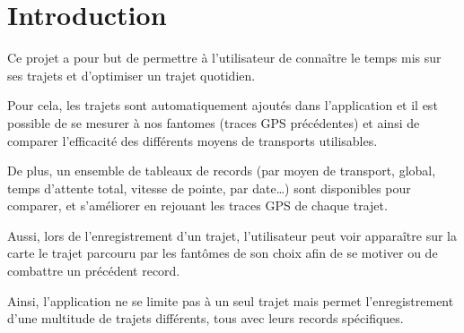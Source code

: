 \chapter{Introduction}


Ce projet a pour but de permettre à l’utilisateur de connaître le temps mis sur ses trajets et d’optimiser un trajet quotidien.

Pour cela, les trajets sont automatiquement ajoutés dans l’application et il est possible de se mesurer à nos \glspl{fantome} (traces \gls{GPS} précédentes) et ainsi de comparer l'efficacité des différents moyens de transports utilisables.

De plus, un ensemble de tableaux de records (par moyen de transport, global, temps d’attente total, vitesse de pointe, par date…) sont disponibles pour comparer, et s’améliorer en rejouant les traces \gls{GPS} de chaque trajet.

Aussi, lors de l’enregistrement d’un trajet, l’utilisateur peut voir apparaître sur la carte le trajet parcouru par les fantômes de son choix afin de se motiver ou de combattre un précédent record.

Ainsi, l’application ne se limite pas à un seul trajet mais permet l’enregistrement d’une multitude de trajets différents, tous avec leurs records spécifiques.

